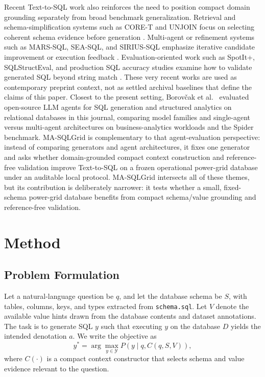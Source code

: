 \documentclass[cmc,article,submit,moreauthors,pdftex]{Definitions/tsp}
\begin{document}
Recent Text-to-SQL work also reinforces the need to position compact domain grounding separately from broad benchmark generalization. Retrieval and schema-simplification systems such as CORE-T and UNJOIN focus on selecting coherent schema evidence before generation \cite{soliman2026coret,ganesan2025unjoin}. Multi-agent or refinement systems such as MARS-SQL, SEA-SQL, and SIRIUS-SQL emphasize iterative candidate improvement or execution feedback \cite{yang2025marssql,li2024seasql,luo2026siriussql}. Evaluation-oriented work such as SpotIt+, SQLStructEval, and production SQL accuracy studies examine how to validate generated SQL beyond string match \cite{tremante2026spotit,zhou2026sqlstructeval,arif2026agentagnostic}. These very recent works are used as contemporary preprint context, not as settled archival baselines that define the claims of this paper. Closest to the present setting, Borov\v{c}ak et al.~\cite{borovcak2026evaluating} evaluated open-source LLM agents for SQL generation and structured analytics on relational databases in this journal, comparing model families and single-agent versus multi-agent architectures on business-analytics workloads and the Spider benchmark. MA-SQLGrid is complementary to that agent-evaluation perspective: instead of comparing generators and agent architectures, it fixes one generator and asks whether domain-grounded compact context construction and reference-free validation improve Text-to-SQL on a frozen operational power-grid database under an auditable local protocol. MA-SQLGrid intersects all of these themes, but its contribution is deliberately narrower: it tests whether a small, fixed-schema power-grid database benefits from compact schema/value grounding and reference-free validation.

\section{Method}\label{method}

\subsection{Problem Formulation}\label{sect:m1}

Let a natural-language question be $q$, and let the database schema be $S$, with tables, columns, keys, and types extracted from \texttt{schema.sql}. Let $V$ denote the available value hints drawn from the database contents and dataset annotations. The task is to generate SQL $y$ such that executing $y$ on the database $D$ yields the intended denotation $a$. We write the objective as
\begin{equation}
y^* = \arg\max_{y \in \mathcal{Y}} P(y \mid q, C(q,S,V)),
\end{equation}
where $C(\cdot)$ is a compact context constructor that selects schema and value evidence relevant to the question.
\end{document}
